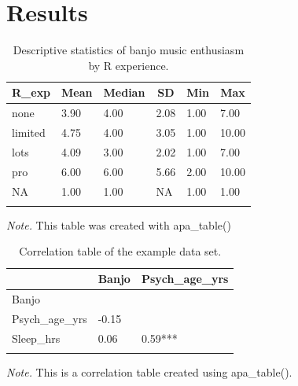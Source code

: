 \documentclass[english,man]{apa6}
\theoremstyle{definition}
\theoremstyle{definition}
\theoremstyle{definition}
\theoremstyle{remark}
\begin{document}
\section{Results}\label{results}

\begin{table}[tbp]
\begin{center}
\begin{threeparttable}
\caption{\label{tab:Banjo-by-experience}Descriptive statistics of banjo music enthusiasm by R experience.}
\begin{tabular}{llllll}
\toprule
R\_exp & \multicolumn{1}{c}{Mean} & \multicolumn{1}{c}{Median} & \multicolumn{1}{c}{SD} & \multicolumn{1}{c}{Min} & \multicolumn{1}{c}{Max}\\
\midrule
none & 3.90 & 4.00 & 2.08 & 1.00 & 7.00\\
limited & 4.75 & 4.00 & 3.05 & 1.00 & 10.00\\
lots & 4.09 & 3.00 & 2.02 & 1.00 & 7.00\\
pro & 6.00 & 6.00 & 5.66 & 2.00 & 10.00\\
NA & 1.00 & 1.00 & NA & 1.00 & 1.00\\
\bottomrule
\addlinespace
\end{tabular}
\begin{tablenotes}[para]
\textit{Note.} This table was created with apa\_table()
\end{tablenotes}
\end{threeparttable}
\end{center}
\end{table}

\begin{table}[tbp]
\begin{center}
\begin{threeparttable}
\caption{\label{tab:apa-corr-table}Correlation table of the example data set.}
\begin{tabular}{lll}
\toprule
 & \multicolumn{1}{c}{Banjo} & \multicolumn{1}{c}{Psych\_age\_yrs}\\
\midrule
Banjo &  & \\
Psych\_age\_yrs & -0.15 & \\
Sleep\_hrs & 0.06 & 0.59***\\
\bottomrule
\addlinespace
\end{tabular}
\begin{tablenotes}[para]
\textit{Note.} This is a correlation table created using apa\_table().
\end{tablenotes}
\end{threeparttable}
\end{center}
\end{table}
\end{document}
